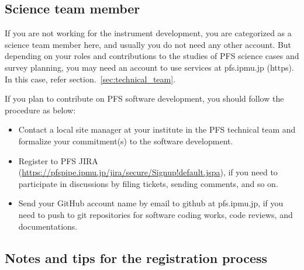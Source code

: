 \documentclass[a4paper,notitlepage]{article}
\begin{document}
\subsection{Science team member}
\label{sec:science_team}

If you are not working for the instrument development, you are categorized as 
a science team member here, and usually you do not need any other account. 
But depending on your roles and contributions to the studies of PFS science 
cases and survey planning, you may need an account to use services at 
pfs.ipmu.jp (https). In this case, refer section.~\ref{sec:technical_team}.

If you plan to contribute on PFS software development, you should follow 
the procedure as below: 

\begin{itemize}
  \item Contact a local site manager at your institute in the PFS technical 
    team and formalize your commitment(s) to the software development.
  \item Register to PFS JIRA 
    (\url{https://pfspipe.ipmu.jp/jira/secure/Signup!default.jspa}), 
    if you need to participate in discussions by filing tickets, sending 
    comments, and so on.
  \item Send your GitHub account name by email to github at pfs.ipmu.jp, if you 
    need to push to git repositories for software coding works, code reviews, 
    and documentations. 
\end{itemize}

\subsection{Notes and tips for the registration process}
\label{sec:account_reg_tips}
\end{document}
